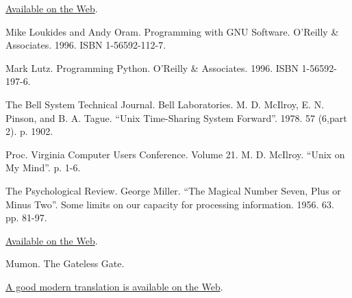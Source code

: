 \documentclass[12pt,oneside]{book}
\begin{document}
\begin{common-format}
\begin{thebibliography}{9}
\href{http://research.microsoft.com/~lampson/33-Hints/WebPage.html}{Available on the Web}.

%
%
%
%
%
%
%
%
%
%
 Mike Loukides and Andy Oram. Programming with GNU Software. O'Reilly \&{} Associates. 1996. ISBN 1-56592-112-7.

 Mark Lutz. Programming Python. O'Reilly \&{} Associates. 1996. ISBN 1-56592-197-6.

 The Bell System Technical Journal. Bell Laboratories. M. D. McIlroy, E. N. Pinson, and B. A. Tague. “Unix Time-Sharing System Forward”. 1978. 57 (6,part 2). p. 1902.

 Proc. Virginia Computer Users Conference. Volume 21. M. D. McIlroy. “Unix on My Mind”. p. 1-6.

 The Psychological Review. George Miller. “The Magical Number Seven, Plus or Minus Two”. Some limits on our capacity for processing information. 1956. 63. pp. 81-97.

\href{http://www.well.com/user/smalin/miller.html}{Available on the Web}.

 Mumon. The Gateless Gate.

\href{http://www.ibiblio.org/zen/cgi-bin/koan-index.pl}{A good modern translation is available on the Web}.


\end{thebibliography}
\end{common-format}
\end{document}
